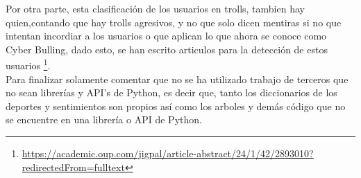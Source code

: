 \documentclass[../all.tex]{subfiles}
\begin{document}
    Por otra parte, esta clasificación de los usuarios en trolls, tambien hay quien,contando que hay trolls agresivos, y no que solo dicen mentiras si no que intentan incordiar a los usuarios o que aplican lo que ahora se conoce como Cyber Bulling, dado esto, se han escrito articulos para la detección de estos usuarios \footnote{\tiny\url{https://academic.oup.com/jigpal/article-abstract/24/1/42/2893010?redirectedFrom=fulltext}\cite{relacionado11}}.\\
    
    Para finalizar solamente comentar que no se ha utilizado trabajo de terceros que no sean librerías y API's de Python, es decir que, tanto los diccionarios de los deportes y sentimientos son propios así como los arboles y demás código que no se encuentre en una librería o API de Python.
    

   
\end{document}
